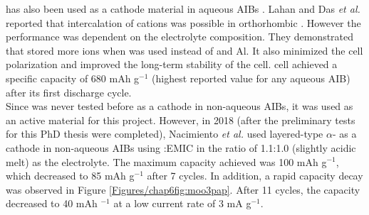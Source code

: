  has also been used as a cathode material in aqueous AIBs \cite{joseph_hexagonal_2019, shakir_structural_2010, lahan_al3+_2019, lahan_active_2018}. Lahan and Das \textit{et al.} reported that intercalation of  cations was possible in orthorhombic . However the performance was dependent on the electrolyte composition. They demonstrated that  stored more  ions when  was used instead of  and Al. It also minimized the cell polarization and improved the long-term stability of the cell.  cell achieved a specific capacity of 680 mAh g$^{-1}$ (highest reported value for any aqueous AIB) after its first discharge cycle. \\ 
Since  was never tested before as a cathode in non-aqueous AIBs, it was used as an active material for this project. However, in 2018 (after the preliminary tests for this PhD thesis were completed), Nacimiento \textit{et al.} used layered-type $\alpha$- as a cathode in non-aqueous AIBs using :EMIC in the ratio of 1.1:1.0 (slightly acidic melt) as the electrolyte. The maximum capacity achieved was 100 mAh g$^{-1}$, which decreased to 85 mAh g$^{-1}$ after 7 cycles. In addition, a rapid capacity decay was observed in Figure \ref{Figures/chap6fig:moo3pap}. After 11 cycles, the capacity decreased to 40 mAh $^{-1}$ at a low current rate of 3 mA g$^{-1}$. 

